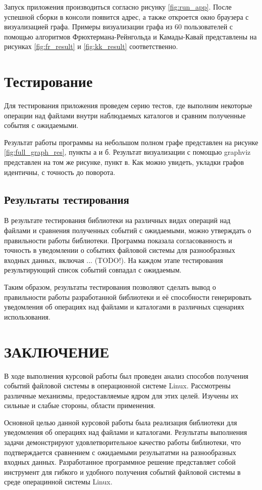 \documentclass[14pt, russian]{scrartcl}
\newcommand{\anonsection}[1]{\cleardoublepage
\phantomsection
\addcontentsline{toc}{section}{\protect\numberline{}#1}
\section*{#1}\vspace*{2.5ex} %
}
\begin{document}
Запуск приложения производиться согласно рисунку \ref{fig:run_app}. После
успешной сборки в консоли появится адрес, а также откроется окно браузера с
визуализацией графа. Примеры визуализации графа из 60 пользователей с помощью
алгоритмов Фрюхтермана-Рейнгольда и Камады-Кавай представлены на рисунках
\ref{fig:fr_result} и \ref{fig:kk_result} соответственно.

\section{Тестирование}

Для тестирования приложения проведем серию тестов, где выполним некоторые
операции над файлами внутри наблюдаемых каталогов и сравним полученные события с
ожидаемыми.


Результат работы программы на небольшом полном графе представлен на рисунке
\ref{fig:full_graph_res}, пункты а и б. Результат визуализации с помощью
graphviz представлен на том же рисунке, пункт в. Как можно увидеть, укладки
графов идентичны, с точность до поворота.

\subsection{Результаты тестирования}

В результате тестирования библиотеки на различных видах операций над файлами и
сравнения полученных событий с ожидаемыми, можно утверждать о правильности
работы библиотеки. Программа показала согласованность и точность в уведомлении о
событиях файловой системы для разнообразных входных данных, включая ... (TODO!).
На каждом этапе тестирования результирующий список событий совпадал с ожидаемым.

Таким образом, результаты тестирования позволяют сделать вывод о правильности
работы разработанной библиотеки и её способности генерировать уведомления об
операциях над файлами и каталогами в различных сценариях использования.

\newpage
\anonsection{ЗАКЛЮЧЕНИЕ}  %

В ходе выполнения курсовой работы был проведен анализ способов получения событий
файловой системы в операционной системе Linux. Рассмотрены различные механизмы,
предоставляемые ядром для этих целей. Изучены их сильные и слабые стороны,
области применения.

Основной целью данной курсовой работы была реализация библиотеки для уведомления
об операциях над файлами и каталогами. Результаты выполнения задачи
демонстрируют удовлетворительное качество работы библиотеки, что подтверждается
сравнением с ожидаемыми резульататми на разнообразных входных данных.
Разработанное программное решение представляет собой инструмент для гибкого и
удобного получения событий файловой системы в среде операцинной системы Linux.
\end{document}
